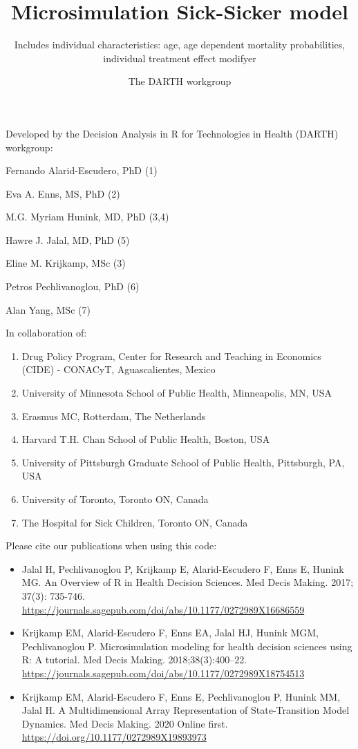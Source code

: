 \documentclass[
]{article}
\title{Microsimulation Sick-Sicker model}
\subtitle{Includes individual characteristics: age, age dependent mortality
probabilities, individual treatment effect modifyer}
\author{The DARTH workgroup}
\date{}
\providecommand{\tightlist}{%
  \setlength{\itemsep}{0pt}\setlength{\parskip}{0pt}}
\begin{document}
\maketitle

Developed by the Decision Analysis in R for Technologies in Health
(DARTH) workgroup:

Fernando Alarid-Escudero, PhD (1)

Eva A. Enns, MS, PhD (2)

M.G. Myriam Hunink, MD, PhD (3,4)

Hawre J. Jalal, MD, PhD (5)

Eline M. Krijkamp, MSc (3)

Petros Pechlivanoglou, PhD (6)

Alan Yang, MSc (7)

In collaboration of:

\begin{enumerate}
\def\labelenumi{\arabic{enumi}.}
\tightlist
\item
  Drug Policy Program, Center for Research and Teaching in Economics
  (CIDE) - CONACyT, Aguascalientes, Mexico
\item
  University of Minnesota School of Public Health, Minneapolis, MN, USA
\item
  Erasmus MC, Rotterdam, The Netherlands
\item
  Harvard T.H. Chan School of Public Health, Boston, USA
\item
  University of Pittsburgh Graduate School of Public Health, Pittsburgh,
  PA, USA
\item
  University of Toronto, Toronto ON, Canada
\item
  The Hospital for Sick Children, Toronto ON, Canada
\end{enumerate}

Please cite our publications when using this code:

\begin{itemize}
\item
  Jalal H, Pechlivanoglou P, Krijkamp E, Alarid-Escudero F, Enns E,
  Hunink MG. An Overview of R in Health Decision Sciences. Med Decis
  Making. 2017; 37(3): 735-746.
  \url{https://journals.sagepub.com/doi/abs/10.1177/0272989X16686559}
\item
  Krijkamp EM, Alarid-Escudero F, Enns EA, Jalal HJ, Hunink MGM,
  Pechlivanoglou P. Microsimulation modeling for health decision
  sciences using R: A tutorial. Med Decis Making. 2018;38(3):400--22.
  \url{https://journals.sagepub.com/doi/abs/10.1177/0272989X18754513}
\item
  Krijkamp EM, Alarid-Escudero F, Enns E, Pechlivanoglou P, Hunink MM,
  Jalal H. A Multidimensional Array Representation of State-Transition
  Model Dynamics. Med Decis Making. 2020 Online first.
  \url{https://doi.org/10.1177/0272989X19893973}
\end{itemize}
\end{document}
